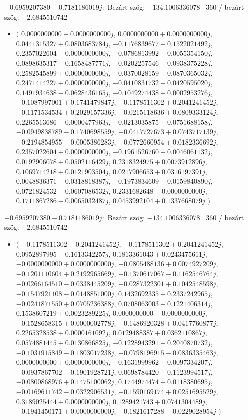\documentclass[14pt,a4paper]{article}
\begin{document}
$-0.6959207380-0.7181186019j$:\
Bezárt szög: $-134.1006336078$ \
360 / bezárt szög: $-2.6845510742$\
\begin{itemize}
\item
$\big($
$0.0000000000-0.0000000000j$, $0.0000000000+0.0000000000j$, $0.0441315327+0.0803683784j$, $-0.1176839677+0.1522021492j$, $0.2357022604-0.0000000000j$, $-0.0786813992-0.0055354150j$, $0.0898635317-0.1658487771j$, $-0.0202257546-0.0938375228j$, $0.2582545899+0.0000000000j$, $-0.0370028159+0.0870365032j$, $0.2471414227+0.0000000000j$, $-0.0410831732+0.0420595020j$, $0.1491934638-0.0628436165j$, $-0.1049274438+0.0002953276j$, $-0.1087997001+0.1741479847j$, $-0.1178511302+0.2041241452j$, $-0.1171534534+0.2029157336j$, $-0.0215118636+0.0809333124j$, $0.2265513686-0.0000477963j$, $-0.0213035875-0.0751688158j$, $-0.0949838789-0.1740698559j$, $-0.0417727673+0.0743717139j$, $-0.2194854955-0.0005386283j$, $-0.0772660954+0.0182336692j$, $0.2357022604+0.0000000000j$, $-0.1961526760-0.0046061132j$, $0.0192906078+0.0502116429j$, $0.2318324975+0.0073912896j$, $0.1069714218+0.0121903504j$, $0.0217906653+0.0316197391j$, $0.0048836371-0.0318818387j$, $-0.1973834609-0.0159840890j$, $0.0721824532-0.0607086532j$, $0.2331682648-0.0000000000j$, $0.1711867286-0.0065032487j$, $0.0453992104+0.1337668079j$
$\big)$
\end{itemize}
$-0.6959207380-0.7181186019j$:\
Bezárt szög: $-134.1006336078$ \
360 / bezárt szög: $-2.6845510742$\
\begin{itemize}
\item
$\big($
$-0.1178511302-0.2041241452j$, $-0.1178511302+0.2041241452j$, $0.0952897995-0.1613342257j$, $0.1813361043+0.0243475611j$, $-0.0000000000+0.0000000000j$, $-0.0805488136+0.0074927209j$, $-0.1201110604+0.2192965669j$, $-0.1370617067-0.1162546764j$, $-0.0266164510-0.0338445209j$, $-0.0287322301+0.1042548598j$, $-0.1547921108-0.0148851000j$, $0.1432692335+0.2337242965j$, $-0.0241871550+0.0705236388j$, $0.0708063003+0.1221406314j$, $0.1538607219+0.0023289225j$, $0.0000000000-0.0000000000j$, $-0.1528658315+0.0000002778j$, $-0.1486920328+0.0417760877j$, $0.2265328538+0.0000161092j$, $0.0129488387+0.0362110867j$, $0.0574881445+0.0130866825j$, $-0.1228943291-0.2040870732j$, $-0.1031915849-0.1803017238j$, $-0.0798196915-0.0836335463j$, $0.0000000000+0.0000000000j$, $-0.1631999962+0.0097334207j$, $-0.0937867702-0.1901928721j$, $0.0698784420-0.1123994517j$, $-0.0800868976+0.1475100062j$, $0.1744974474-0.0118380695j$, $-0.0169611742-0.0322906531j$, $-0.1590169174+0.0251695529j$, $0.3189025444+0.0000000000j$, $0.1289421743+0.0741304489j$, $-0.1941450171+0.0000000000j$, $-0.1821617288-0.0229028954j$
$\big)$
\end{itemize}
\end{document}
